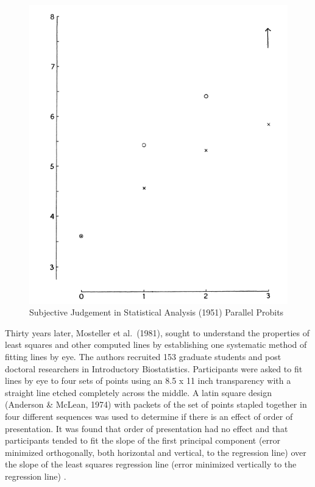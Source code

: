 \documentclass[print]{nuthesis}
\begin{document}
\begin{figure}[tbp]

{\centering \includegraphics[width=0.5\linewidth,]{images/02-you-draw-it/subjective-judgement-plot} 

}

\caption{Subjective Judgement in Statistical Analysis (1951) Parallel Probits}\label{fig:subjective-judgement}
\end{figure}

Thirty years later, Mosteller et al.~(1981), sought to understand the properties of least squares and other computed lines by establishing one systematic method of fitting lines by eye.
The authors recruited 153 graduate students and post doctoral researchers in Introductory Biostatistics.
Participants were asked to fit lines by eye to four sets of points  using an 8.5 x 11 inch transparency with a straight line etched completely across the middle.
A latin square design (Anderson \& McLean, 1974) with packets of the set of points stapled together in four different sequences was used to determine if there is an effect of order of presentation.
It was found that order of presentation had no effect and that participants tended to fit the slope of the first principal component (error minimized orthogonally, both horizontal and vertical, to the regression line) over the slope of the least squares regression line (error minimized vertically to the regression line) . 
\end{document}
